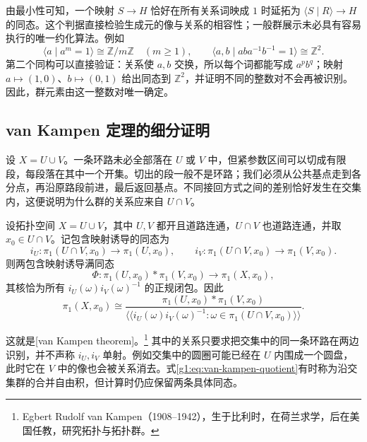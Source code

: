 由最小性可知，一个映射 \(S\to H\) 恰好在所有关系词映成 \(1\) 时延拓为 \(\langle S\mid R\rangle\to H\) 的同态。这个判据直接检验生成元的像与关系的相容性；一般群展示未必具有容易执行的唯一约化算法。例如
\[
	\langle a\mid a^m=1\rangle\cong\mathbb Z/m\mathbb Z\quad(m\ge1),\qquad
	\langle a,b\mid aba^{-1}b^{-1}=1\rangle\cong\mathbb Z^2.
\]
第二个同构可以直接验证：关系使 \(a,b\) 交换，所以每个词都能写成 \(a^pb^q\)；映射 \(a\mapsto(1,0)\)、\(b\mapsto(0,1)\) 给出同态到 \(\mathbb Z^2\)，并证明不同的整数对不会再被识别。因此，群元素由这一整数对唯一确定。

\subsection{van Kampen 定理的细分证明}
\label{g1:subsec:0502:02}

设 \(X=U\cup V\)。一条环路未必全部落在 \(U\) 或 \(V\) 中，但紧参数区间可以切成有限段，每段落在其中一个开集。切出的段一般不是环路；我们必须从公共基点走到各分点，再沿原路段前进，最后返回基点。不同接回方式之间的差别恰好发生在交集内，这便说明为什么群的关系应来自 \(U\cap V\)。

\begin{theorem}\label{g1:thm:van-kampen}
	设拓扑空间 \(X=U\cup V\)，其中 \(U,V\) 都开且道路连通，\(U\cap V\) 也道路连通，并取 \(x_0\in U\cap V\)。记包含映射诱导的同态为
	\[
		i_U:\pi_1(U\cap V,x_0)\to\pi_1(U,x_0),\qquad
		i_V:\pi_1(U\cap V,x_0)\to\pi_1(V,x_0).
	\]
	则两包含映射诱导满同态
	\[
		\Phi:\pi_1(U,x_0)*\pi_1(V,x_0)\longrightarrow\pi_1(X,x_0),
	\]
	其核恰为所有 \(i_U(\omega)i_V(\omega)^{-1}\) 的正规闭包。因此
	\begin{equation}\label{g1:eq:van-kampen-quotient}
		\pi_1(X,x_0)\cong
		\frac{\pi_1(U,x_0)*\pi_1(V,x_0)}
		{\langle\!\langle i_U(\omega)i_V(\omega)^{-1}:\omega\in\pi_1(U\cap V,x_0)\rangle\!\rangle}.
	\end{equation}
\end{theorem}

这就是[van Kampen theorem]。\footnote{Egbert Rudolf van Kampen（1908--1942），生于比利时，在荷兰求学，后在美国任教，研究拓扑与拓扑群。} 其中的关系只要求把交集中的同一条环路在两边识别，并不声称 \(i_U,i_V\) 单射。例如交集中的圆圈可能已经在 \(U\) 内围成一个圆盘，此时它在 \(V\) 中的像也会被关系消去。式\eqref{g1:eq:van-kampen-quotient}有时称为沿交集群的合并自由积，但计算时仍应保留两条具体同态。

